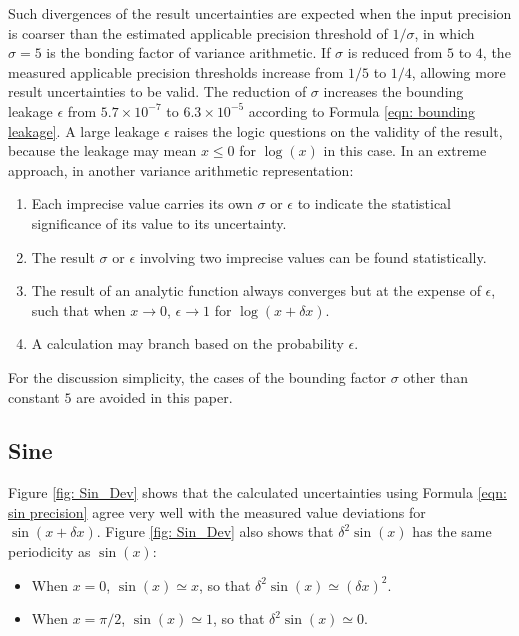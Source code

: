 \documentclass[twoside]{article}
\numberwithin{equation}{section}
\begin{document}
Such divergences of the result uncertainties are expected when the input precision is coarser than the estimated applicable precision threshold of $1/\sigma$, in which $\sigma=5$ is the bonding factor of variance arithmetic.
If $\sigma$ is reduced from $5$ to $4$, the measured applicable precision thresholds increase from $1/5$ to $1/4$, allowing more result uncertainties to be valid.
The reduction of $\sigma$ increases the bounding leakage $\epsilon$ from $5.7 \times 10^{-7}$ to $6.3 \times 10^{-5}$ according to Formula \eqref{eqn: bounding leakage}.
A large leakage $\epsilon$ raises the logic questions on the validity of the result, because the leakage may mean $x \leq 0$ for $\log(x)$ in this case.
In an extreme approach, in another variance arithmetic representation:
\begin{enumerate}

\item Each imprecise value carries its own $\sigma$ or $\epsilon$ to indicate the statistical significance of its value to its uncertainty.

\item The result $\sigma$ or $\epsilon$ involving two imprecise values can be found statistically.

\item The result of an analytic function always converges but at the expense of $\epsilon$, such that  when $x \rightarrow 0$, $\epsilon \rightarrow 1$ for $\log(x + \delta x)$. 

\item A calculation may branch based on the probability $\epsilon$.

\end{enumerate}
For the discussion simplicity, the cases of the bounding factor $\sigma$ other than constant $5$ are avoided in this paper.




\subsection{Sine}

Figure \ref{fig: Sin_Dev} shows that the calculated uncertainties using Formula \eqref{eqn: sin precision} agree very well with the measured value deviations for $\sin(x + \delta x)$.
Figure \ref{fig: Sin_Dev} also shows that $\delta^2 \sin(x)$ has the same periodicity as $\sin(x)$:
\begin{itemize}
\item When $x=0$, $\sin(x) \simeq x$, so that $\delta^2 \sin(x) \simeq (\delta x)^2$.
\item When $x=\pi/2$, $\sin(x) \simeq 1$, so that $\delta^2 \sin(x) \simeq 0$.
\end{itemize}
\end{document}
